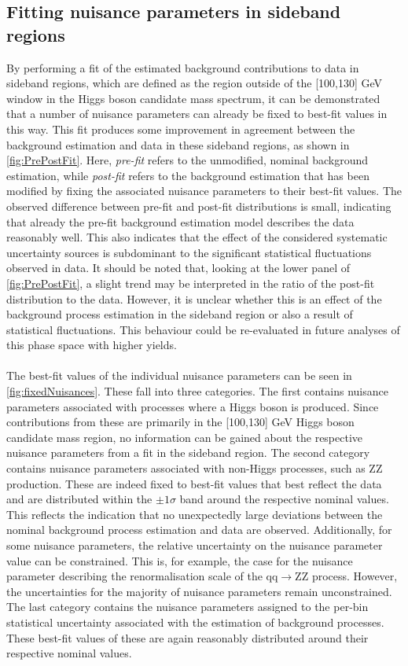 \subsection{Fitting nuisance parameters in sideband regions}
By performing a fit of the estimated background contributions to data in sideband regions, which are defined as the region outside of the [100,130] GeV window in the Higgs boson candidate mass spectrum, it can be demonstrated that a number of nuisance parameters can already be fixed to best-fit values in this way. This fit produces some improvement in agreement between the background estimation and data in these sideband regions, as shown in \autoref{fig:PrePostFit}. Here, \textit{pre-fit} refers to the unmodified, nominal background estimation, while \textit{post-fit} refers to the background estimation that has been modified by fixing the associated nuisance parameters to their best-fit values. The observed difference between pre-fit and post-fit distributions is small, indicating that already the pre-fit background estimation model describes the data reasonably well. This also indicates that the effect of the considered systematic uncertainty sources is subdominant to the significant statistical fluctuations observed in data. It should be noted that, looking at the lower panel of \autoref{fig:PrePostFit}, a slight trend may be interpreted in the ratio of the post-fit distribution to the data. However, it is unclear whether this is an effect of the background process estimation in the sideband region or also a result of statistical fluctuations. This behaviour could be re-evaluated in future analyses of this phase space with higher yields. \\
\\
The best-fit values of the individual nuisance parameters can be seen in \autoref{fig:fixedNuisances}. These fall into three categories. The first contains nuisance parameters associated with processes where a Higgs boson is produced. Since contributions from these are primarily in the [100,130] GeV Higgs boson candidate mass region, no information can be gained about the respective nuisance parameters from a fit in the sideband region. The second category contains nuisance parameters associated with non-Higgs processes, such as ZZ production. These are indeed fixed to best-fit values that best reflect the data and are distributed within the $\pm 1\sigma$ band around the respective nominal values. This reflects the indication that no unexpectedly large deviations between the nominal background process estimation and data are observed. Additionally, for some nuisance parameters, the relative uncertainty on the nuisance parameter value can be constrained. This is, for example, the case for the nuisance parameter describing the renormalisation scale of the qq$\rightarrow$ZZ process. However, the uncertainties for the majority of nuisance parameters remain unconstrained. The last category contains the nuisance parameters assigned to the per-bin statistical uncertainty associated with the estimation of background processes. These best-fit values of these are again reasonably distributed around their respective nominal values. 
